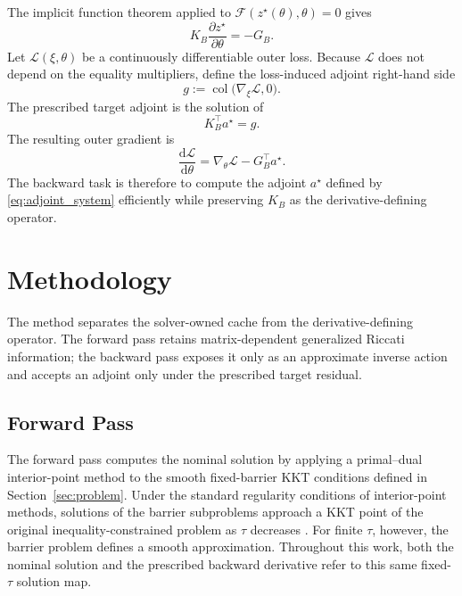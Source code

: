 \documentclass[letterpaper,10pt,conference]{ieeeconf}
\begin{document}
The implicit function theorem \cite{dontchev2014implicit} applied to
$\mathcal F(z^\star(\theta),\theta)=0$ gives
\begin{equation}
K_B
\frac{\partial z^\star}{\partial\theta}
=
-G_B.
\label{eq:solution_sensitivity}
\end{equation}
Let $\mathcal L(\xi,\theta)$ be a continuously differentiable outer
loss. Because $\mathcal L$ does not depend on the equality
multipliers, define the loss-induced adjoint right-hand side
\begin{equation}
g:=
\operatorname{col}
\bigl(\nabla_\xi\mathcal L,0\bigr).
\label{eq:loss_seed}
\end{equation}
The prescribed target adjoint is the solution of
\begin{equation}
K_B^\top a^\star=g.
\label{eq:adjoint_system}
\end{equation}
The resulting outer gradient is
\begin{equation}
\frac{\mathrm d\mathcal L}{\mathrm d\theta}
=
\nabla_\theta\mathcal L-G_B^\top a^\star.
\label{eq:loss_gradient}
\end{equation}
The backward task is therefore to compute the adjoint $a^\star$ defined
by \eqref{eq:adjoint_system} efficiently while preserving $K_B$ as the
derivative-defining operator.

\section{Methodology}
\label{sec:method}

The method separates the solver-owned cache from the derivative-defining
operator. The forward pass retains matrix-dependent generalized Riccati
information; the backward pass exposes it only as an approximate inverse
action and accepts an adjoint only under the prescribed target residual.

\subsection{Forward Pass}
\label{sec:forward_pass}

The forward pass computes the nominal solution by applying a
primal--dual interior-point method to the smooth fixed-barrier KKT
conditions defined in Section~\ref{sec:problem}. Under the standard
regularity conditions of interior-point methods, solutions of the
barrier subproblems approach a KKT point of the original
inequality-constrained problem as $\tau$ decreases
\cite{wachter2006ipopt}. For finite $\tau$, however, the barrier
problem defines a smooth approximation. Throughout this work, both the
nominal solution and the prescribed backward derivative refer to this
same fixed-$\tau$ solution map.
\end{document}
